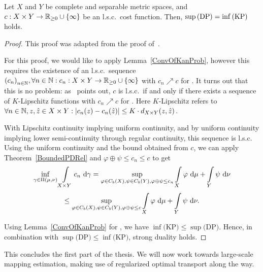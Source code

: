 \begin{theorem}\label{GenPDRel}
	Let $X$ and $Y$ be complete and separable metric spaces, and $\map[c]{X \times Y}{\RZero \cup \{ \infty \}}$ be an l.s.c.\ cost function. Then, $\sup\!\text{\normalfont\,(DP)} = \inf\!\text{\normalfont\,(KP)}$ holds.
\end{theorem}

\begin{proof}
	This proof was adapted from the proof of\ \cite[Theorem~1.42]{San2015}.

	For this proof, we would like to apply Lemma~\ref{ConvOfKanProb}, however this requires the existence of an l.s.c.\ sequence ${(c_n)}_{\NinN}, \forall \NinN: \map[c_n]{X \times Y}{\RZero \cup \{ \infty \}}$ with $c_n \nearrow c$ for \Ninf. It turns out that this is no problem: as\ \cite[Box~1.5]{San2015} points out, $c$ is l.s.c.\ if and only if there exists a sequence of $K$-Lipschitz functions with $c_n \nearrow c$ for \Ninf. Here $K$-Lipschitz refers to $\forall \NinN{}, z, \hat{z} \in X \times Y: \vert c_n(z) - c_n(\hat{z}) \vert \le K \cdot d_{X \times Y}(z, \hat{z})$.

	With Lipschitz continuity implying uniform continuity, and by uniform continuity implying lower semi-continuity through regular continuity, this sequence is l.s.c. Using the uniform continuity and the bound obtained from $c$, we can apply Theorem~\ref{BoundedPDRel} and $\varphi \oplus \psi \le c_n \le c$ to get
	\[ \inf\limits_{\gamma \in \TP{\mu}{\nu}} \int\limits_{X \times Y} c_n~\D[\gamma] = \sup\limits_{\varphi \in \CF[b]{X}, \psi \in \CF[b]{Y}, \varphi \oplus \psi \le c_n} \int\limits_X \varphi~\D + \int\limits_Y \psi~\D[\nu] \]
	\[ \le \sup\limits_{\varphi \in \CF[b]{X}, \psi \in \CF[b]{Y}, \varphi \oplus \psi \le c} \int\limits_X \varphi~\D + \int\limits_Y \psi~\D[\nu]. \]

	Using Lemma~\ref{ConvOfKanProb} for \Ninf, we have $\inf \text{(KP)} \le \sup \text{(DP)}$. Hence, in combination with $\sup \text{(DP)} \le \inf \text{(KP)}$, strong duality holds.
\end{proof}

This concludes the first part of the thesis. We will now work towards large-scale mapping estimation, making use of regularized optimal transport along the way.